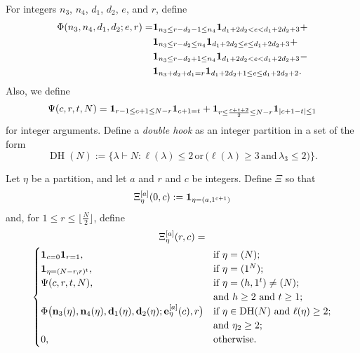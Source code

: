 \documentclass[12pt]{article}
\begin{document}
 For integers $n_3$, $n_4$, $d_1$, $d_2$, $e$, and $r$, define
\begin{align*} 
 \Phi(n_3, n_4, d_1, d_2; e, r) 
 = & \text{{\bf 1}}_{n_3 \leq r - d_2 - 1 \leq n_4} \text{{\bf 1}}_{d_1 + 2 d_2 < e < d_1 + 2 d_2 +3} + \\
 & \text{{\bf 1}}_{n_3 \leq r - d_2 \leq n_4} \text{{\bf 1}}_{d_1 + 2 d_2 \leq e \leq d_1 + 2 d_2 +3} + \\ 
 & \text{{\bf 1}}_{n_3 \leq r - d_2 + 1 \leq n_4} \text{{\bf 1}}_{d_1 + 2 d_2 < e < d_1 + 2 d_2 +3} - \\ 
 & \text{{\bf 1}}_{n_3 + d_2 + d_1 = r} \text{{\bf 1}}_{d_1 + 2 d_2 + 1 \leq e \leq d_1 + 2 d_2 +2}.
\end{align*} 
 Also, we define $$ \Psi(c,r,t,N) = \text{{\bf 1}}_{r-1 \leq c+1 \leq N-r} \text{{\bf 1}}_{c+1=t} + \text{{\bf 1}}_{r \leq \frac{c+t+2}{2} \leq N - 
 r} \text{{\bf 1}}_{ |c + 1 -t| \leq 1} $$ for integer arguments. Define a \emph{double hook} as an integer partition in a set of the form 
 $$ \operatorname{DH}(N) := \big\{ \lambda \vdash N : \ell(\lambda) \leq 2 \, \text{or} \, \big( \ell(\lambda) \geq 3 \, \text{and} 
 \, \lambda_{3} \leq 2 \big) \big\}. $$ 

 Let $\eta$ be a partition, and let $a$ and $r$ and $c$ be integers. Define ${\Xi}$ so that $$ {\Xi}_{\eta}^{[a]}(0, c) := \text{{\bf 1}}_{\eta = 
 (a, 1^{c + 1})} $$ and, for $1 \leq r \leq \lfloor \frac{N}{2} \rfloor$, define
\begin{multline*} 
 {\Xi}_{\eta}^{[a]}(r, c) = \\
 \begin{cases} 
 \text{{\bf 1}}_{c=0} \text{{\bf 1}}_{r=1}, & \text{if $ \eta = (N)$;} \\
 \text{{\bf 1}}_{\eta = (N - r, r)^{\operatorname{t}}}, & \text{if $\eta = (1^N)$;} \\ 
 \Psi(c,r,t,N), & \text{if $\eta = (h, 1^{t}) \neq (N)$;} \\
 \null & \text{and $h \geq 2$ and $t \geq 1$;} \\ 
 \Phi\big( \text{{\bf n}}_{3}(\eta), \text{{\bf n}}_{4}(\eta), \text{{\bf d}}_{1}(\eta), 
 \text{{\bf d}}_{2}(\eta); 
 \text{{\bf e}}_{\eta}^{[a]}(c), r \big) & \text{if $\eta \in \operatorname{DH}(N)$ 
 and $\ell(\eta) \geq 2$;} \\ 
 \null & \text{and $\eta_2 \geq 2$;} \\
 0, & \text{otherwise.} 
 \end{cases}
\end{multline*}
\end{document}
